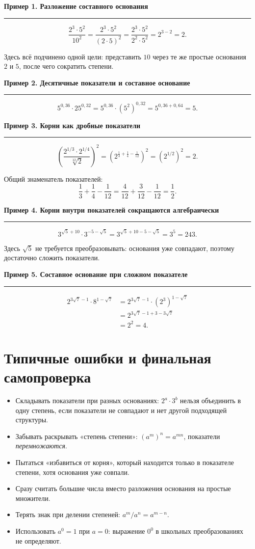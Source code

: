 \documentclass[a4paper,12pt]{article}
\newcommand{\topic}[1]{%
  \vspace{0.6em}
  {\large\bfseries\color{darkaccent}#1}\par
  \vspace{0.15em}\color{linegray}\hrule\color{textgray}\vspace{0.35em}
}
\begin{document}
\topic{Пример 1. Разложение составного основания}
\[
\frac{2^3\cdot5^2}{10^2}
=\frac{2^3\cdot5^2}{(2\cdot5)^2}
=\frac{2^3\cdot5^2}{2^2\cdot5^2}
=2^{3-2}=2.
\]

Здесь всё подчинено одной цели: представить \(10\) через те же простые основания \(2\) и \(5\), после чего сократить степени.

\topic{Пример 2. Десятичные показатели и составное основание}
\[
5^{0{,}36}\cdot25^{0{,}32}
=5^{0{,}36}\cdot(5^2)^{0{,}32}
=5^{0{,}36+0{,}64}
=5.
\]

\topic{Пример 3. Корни как дробные показатели}
\[
\left(
\frac{2^{1/3}\cdot2^{1/4}}{\sqrt[12]{2}}
\right)^2
=\left(2^{\frac13+\frac14-\frac1{12}}\right)^2
=\left(2^{1/2}\right)^2
=2.
\]

Общий знаменатель показателей:
\[
\frac13+\frac14-\frac1{12}
=\frac4{12}+\frac3{12}-\frac1{12}
=\frac12.
\]

\topic{Пример 4. Корни внутри показателей сокращаются алгебраически}
\[
3^{\sqrt5+10}\cdot3^{-5-\sqrt5}
=3^{\sqrt5+10-5-\sqrt5}
=3^5=243.
\]

Здесь \(\sqrt5\) не требуется преобразовывать: основания уже совпадают, поэтому достаточно сложить показатели.

\topic{Пример 5. Составное основание при сложном показателе}
\begin{align*}
2^{3\sqrt7-1}\cdot8^{1-\sqrt7}
&=2^{3\sqrt7-1}\cdot(2^3)^{1-\sqrt7}\\
&=2^{3\sqrt7-1+3-3\sqrt7}\\
&=2^2=4.
\end{align*}

\clearpage
\section*{Типичные ошибки и финальная самопроверка}
\begin{itemize}[label={\(\square\)}]
  \item Складывать показатели при разных основаниях: \(2^a\cdot3^b\) нельзя объединить в одну степень, если показатели не совпадают и нет другой подходящей структуры.
  \item Забывать раскрывать «степень степени»: \((a^m)^n=a^{mn}\), показатели \emph{перемножаются}.
  \item Пытаться «избавиться от корня», который находится только в показателе степени, хотя основания уже совпали.
  \item Сразу считать большие числа вместо разложения основания на простые множители.
  \item Терять знак при делении степеней: \(a^m/a^n=a^{m-n}\).
  \item Использовать \(a^0=1\) при \(a=0\): выражение \(0^0\) в школьных преобразованиях не определяют.
\end{itemize}
\end{document}
